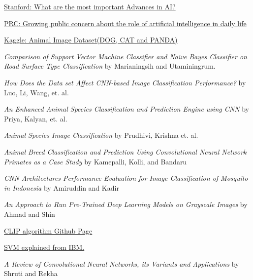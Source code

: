 \documentclass[a4paper,10pt]{article}
\begin{document}
  \begin{thebibliography}{}

     \href{https://ai100.stanford.edu/gathering-strength-gathering-storms-one-hundred-year-study-artificial-intelligence-ai100-2021-1/sq2#:~:text=In%20the%20last%20five%20years,and%20integration%20of%20vision%20and}{Stanford: What are the most important Advances in AI?}

     \href{https://www.pewresearch.org/short-reads/2023/08/28/growing-public-concern-about-the-role-of-artificial-intelligence-in-daily-life/}{PRC: Growing public concern about the role of artificial intelligence in daily life}
  
     \href{https://www.kaggle.com/datasets/ashishsaxena2209/animal-image-datasetdog-cat-and-panda}{Kaggle: Animal Image Dataset(DOG, CAT and PANDA)}

     \emph{Comparison of Support Vector Machine Classifier and Naïve Bayes Classifier on Road Surface Type Classification} by Marianingsih and Utaminingrum.

     \emph{How Does the Data set Affect CNN-based Image Classification Performance?} by Luo, Li, Wang, et. al.

     \emph{An Enhanced Animal Species Classification and Prediction Engine using CNN} by Priya, Kalyan, et. al.
  
     \emph{Animal Species Image Classification} by Prudhivi, Krishna et. al.

     \emph{Animal Breed Classification and Prediction Using Convolutional Neural Network Primates as a Case Study} by Kamepalli, Kolli, and Bandaru

     \emph{CNN Architectures Performance Evaluation for Image Classification of Mosquito in Indonesia} by Amiruddin and Kadir
    
     \emph{An Approach to Run Pre-Trained Deep Learning Models on Grayscale Images} by Ahmad and Shin

     \href{https://github.com/openai/CLIP/tree/main}{CLIP algorithm Github Page}

     \href{https://www.ibm.com/docs/en/spss-modeler/saas?topic=models-how-svm-works}{SVM explained from IBM.}
    
     \emph{A Review of Convolutional Neural Networks, its Variants and Applications} by Shruti and Rekha


\end{thebibliography}
\end{document}
